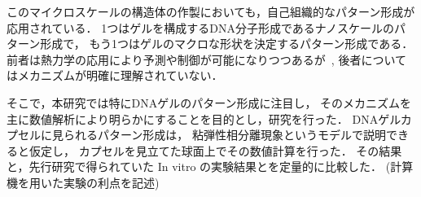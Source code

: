 このマイクロスケールの構造体の作製においても，自己組織的なパターン形成が応用されている．
1つはゲルを構成するDNA分子形成であるナノスケールのパターン形成で，
もう1つはゲルのマクロな形状を決定するパターン形成である．
前者は熱力学の応用により予測や制御が可能になりつつあるが~\cite{zadeh2011nupack}, 
後者についてはメカニズムが明確に理解されていない．

そこで，本研究では特にDNAゲルのパターン形成に注目し，
そのメカニズムを主に数値解析により明らかにすることを目的とし，研究を行った．
DNAゲルカプセルに見られるパターン形成は，
粘弾性相分離現象というモデルで説明できると仮定し，
カプセルを見立てた球面上でその数値計算を行った．
その結果と，先行研究で得られていた In vitro の実験結果とを定量的に比較した．
(計算機を用いた実験の利点を記述)
